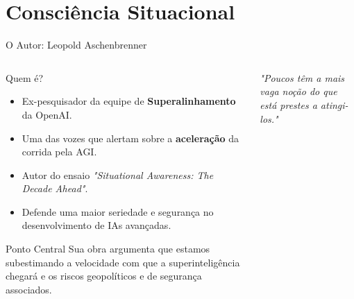 \documentclass[aspectratio=169,12pt]{beamer}
\begin{document}

\section{Consciência Situacional}

\begin{frame}{O Autor: Leopold Aschenbrenner}
    \begin{columns}
        \begin{column}{0.6\textwidth}
            \begin{block}{Quem é?}
                \begin{itemize}
                    \item Ex-pesquisador da equipe de \textbf{Superalinhamento} da OpenAI.
                    \item Uma das vozes que alertam sobre a \textbf{aceleração} da corrida pela AGI.
                    \item Autor do ensaio \textit{"Situational Awareness: The Decade Ahead"}.
                    \item Defende uma maior seriedade e segurança no desenvolvimento de IAs avançadas.
                \end{itemize}
            \end{block}
             \begin{exampleblock}{Ponto Central}
               Sua obra argumenta que estamos subestimando a velocidade com que a superinteligência chegará e os riscos geopolíticos e de segurança associados.
            \end{exampleblock}
        \end{column}
        \begin{column}{0.4\textwidth}
            \begin{center}
                {\Huge \faUserSecret}

                \vspace{1cm}
                
                \textit{"Poucos têm a mais vaga noção do que está prestes a atingi-los."}
            \end{center}
        \end{column}
    \end{columns}
\end{frame}
\end{document}
